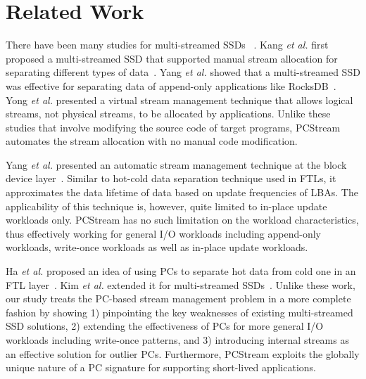 \vspace{-10pt}
\section{Related Work}
\vspace{-5pt}

There have been many studies for multi-streamed SSDs ~\cite{MultiStream, Level,
vStream, FStream, AutoStream, PCStream}.  Kang {\it et al.} first proposed a
multi-streamed SSD that supported manual stream allocation for separating
different types of data~\cite{MultiStream}.  Yang {\it et al.} showed that a
multi-streamed SSD was effective for separating data of append-only
applications like RocksDB~\cite{Level}.  Yong {\it et al.} presented a virtual
stream management technique that allows logical streams, not physical streams,
to be allocated by applications.
Unlike these studies that involve modifying the source code of target programs, 
\textsf{\small PCStream} automates the stream allocation with no manual code modification.

\begin{comment}
Rho {\it et al.} proposed a stream management technique, called FStream, at the
file system layer~\cite{FStream}. In FStream, metadata, journal
data, and user data that may have different lifetime characteristics were
allocated to separate streams.  Since FStream was implemented as a part of a file
system, it was not able to directly detect application's I/O behaviors.
Also, it may be hard to be deployed in practice due to 
a strong dependence on file system-specific implementation details.
\textsf{\small PCStream}, on the other hand, efficiently exploits
programs' I/O behaviors using PCs with no file system-specific modifications.
\end{comment}

Yang {\it et al.} presented an automatic stream management technique at the
block device layer~\cite{AutoStream}. Similar to hot-cold data separation technique used in FTLs,
it approximates the data lifetime of data based on update frequencies of LBAs.
The applicability of this technique is, however, quite limited to in-place update workloads only.  
\textsf{\small PCStream} has no such limitation on the workload characteristics, thus effectively working for general
I/O workloads including append-only workloads, write-once workloads as well as in-place update workloads.

Ha {\it et al.} proposed an idea of using PCs to separate hot data from cold
one in an FTL layer~\cite{PCHa}.  Kim {\it et al.} extended it for
multi-streamed SSDs~\cite{PCStream}.  
Unlike these work, our study treats the PC-based stream management problem in a more complete fashion by 
showing 1) pinpointing the key weaknesses of existing multi-streamed SSD solutions, 
2) extending the effectiveness of PCs for more general I/O workloads 
including write-once patterns, and 3)
introducing internal streams as an effective solution for outlier PCs.  
Furthermore, \textsf{\small PCStream} exploits the globally unique nature of a PC signature 
for supporting short-lived applications.

